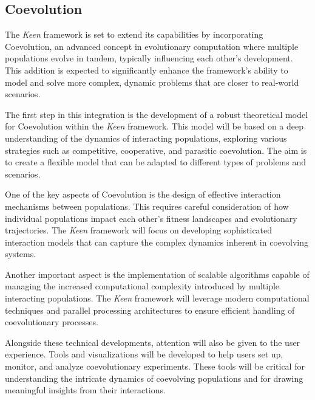         \subsection{Coevolution}
        \label{sec:future:coev}
            The \textit{Keen} framework is set to extend its capabilities by incorporating Coevolution, an advanced 
            concept in evolutionary computation where multiple populations evolve in tandem, typically influencing each 
            other's development. This addition is expected to significantly enhance the framework's ability to model and 
            solve more complex, dynamic problems that are closer to real-world scenarios.
        
            The first step in this integration is the development of a robust theoretical model for Coevolution within 
            the \textit{Keen} framework. This model will be based on a deep understanding of the dynamics of interacting 
            populations, exploring various strategies such as competitive, cooperative, and parasitic coevolution. The 
            aim is to create a flexible model that can be adapted to different types of problems and scenarios.
        
            One of the key aspects of Coevolution is the design of effective interaction mechanisms between populations. 
            This requires careful consideration of how individual populations impact each other's fitness landscapes and 
            evolutionary trajectories. The \textit{Keen} framework will focus on developing sophisticated interaction 
            models that can capture the complex dynamics inherent in coevolving systems.
        
            Another important aspect is the implementation of scalable algorithms capable of managing the increased 
            computational complexity introduced by multiple interacting populations. The \textit{Keen} framework will 
            leverage modern computational techniques and parallel processing architectures to ensure efficient handling 
            of coevolutionary processes.
        
            Alongside these technical developments, attention will also be given to the user experience. Tools and 
            visualizations will be developed to help users set up, monitor, and analyze coevolutionary experiments. 
            These tools will be critical for understanding the intricate dynamics of coevolving populations and for 
            drawing meaningful insights from their interactions.


